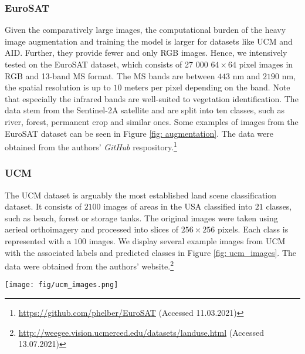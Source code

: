 \documentclass[journal]{IEEEtran}
\begin{document}
\subsubsection{EuroSAT}
 Given the comparatively large images, the computational burden of the heavy image augmentation and training the model is larger for datasets like UCM and AID. Further, they provide fewer and only RGB images. Hence, we intensively tested on the EuroSAT dataset, which consists of 27 000 $64 \times 64$ pixel images in RGB and 13-band MS format. The MS bands are between $443$ nm and $2190$ nm, the spatial resolution is up to $10$ meters per pixel depending on the band. Note that especially the infrared bands are well-suited to vegetation identification. The data stem from the Sentinel-2A satellite and are split into ten classes, such as river, forest, permanent crop and similar ones. Some examples of images from the EuroSAT dataset can be seen in Figure \ref{fig: augmentation}. The data were obtained from the authors' \textit{GitHub} respository.\footnote{\url{https://github.com/phelber/EuroSAT} (Accessed 11.03.2021)} 

\subsubsection{UCM}
The UCM dataset is arguably the most established land scene classification dataset. It consists of $2100$ images of areas in the USA classified into $21$ classes, such as beach, forest or storage tanks. The original images were taken using aerieal orthoimagery and processed into slices of $256 \times 256$ pixels. Each class is represented with a $100$ images. We display several example images from UCM with the associated labels and predicted classes in Figure \ref{fig: ucm_images}. The data were obtained from the authors' website.\footnote{\url{http://weegee.vision.ucmerced.edu/datasets/landuse.html} (Accessed 13.07.2021)}

\begin{figure*}[ht]
\centering
\texttt{[image: fig/ucm\_images.png]}
\caption{Examples of UCM images with ground-truth labels (GT) and predicted classes (PR). Prediction was performed with an EfficientNet-B2 model trained with five images per class on one seed.}
\label{fig: ucm_images}
\end{figure*}
\end{document}
